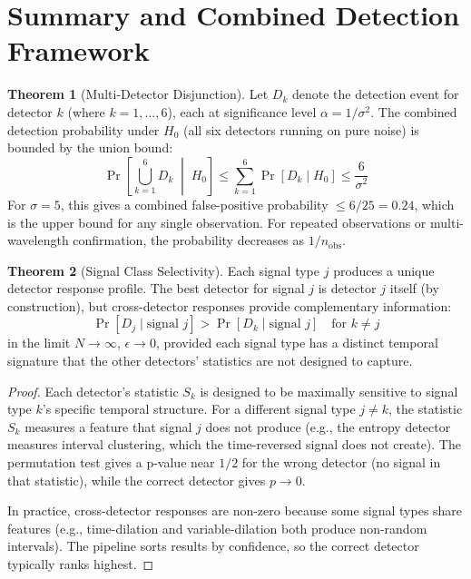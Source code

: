 \documentclass[11pt]{article}
\theoremstyle{definition}
\newtheorem{theorem}{Theorem}[section]
\begin{document}
\section{Summary and Combined Detection Framework}

\begin{theorem}[Multi-Detector Disjunction]
\label{thm:combined}
Let $D_k$ denote the detection event for detector $k$ (where $k = 1, \ldots, 6$), each at significance level $\alpha = 1/\sigma^2$. The combined detection probability under $H_0$ (all six detectors running on pure noise) is bounded by the union bound:
\begin{equation}
\Pr\left[\bigcup_{k=1}^{6} D_k \;\middle|\; H_0\right] \le \sum_{k=1}^{6} \Pr[D_k \mid H_0] \le \frac{6}{\sigma^2}
\end{equation}
For $\sigma = 5$, this gives a combined false-positive probability $\le 6/25 = 0.24$, which is the upper bound for any single observation. For repeated observations or multi-wavelength confirmation, the probability decreases as $1/n_{\text{obs}}$.
\end{theorem}

\begin{theorem}[Signal Class Selectivity]
Each signal type $j$ produces a unique detector response profile. The best detector for signal $j$ is detector $j$ itself (by construction), but cross-detector responses provide complementary information:
\begin{equation}
\Pr[D_j \mid \text{signal } j] > \Pr[D_k \mid \text{signal } j] \quad \text{for } k \neq j
\end{equation}
in the limit $N \to \infty$, $\epsilon \to 0$, provided each signal type has a distinct temporal signature that the other detectors' statistics are not designed to capture.
\end{theorem}

\begin{proof}
Each detector's statistic $S_k$ is designed to be maximally sensitive to signal type $k$'s specific temporal structure. For a different signal type $j \neq k$, the statistic $S_k$ measures a feature that signal $j$ does not produce (e.g., the entropy detector measures interval clustering, which the time-reversed signal does not create). The permutation test gives a p-value near $1/2$ for the wrong detector (no signal in that statistic), while the correct detector gives $p \to 0$.

In practice, cross-detector responses are non-zero because some signal types share features (e.g., time-dilation and variable-dilation both produce non-random intervals). The pipeline sorts results by confidence, so the correct detector typically ranks highest.
\end{proof}
\end{document}

